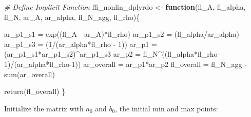 \documentclass[
]{book}
\newenvironment{Shaded}{\begin{snugshade}}{\end{snugshade}}
\newcommand{\CommentTok}[1]{\textcolor[rgb]{0.56,0.35,0.01}{\textit{#1}}}
\newcommand{\ControlFlowTok}[1]{\textcolor[rgb]{0.13,0.29,0.53}{\textbf{#1}}}
\newcommand{\DecValTok}[1]{\textcolor[rgb]{0.00,0.00,0.81}{#1}}
\newcommand{\FunctionTok}[1]{\textcolor[rgb]{0.00,0.00,0.00}{#1}}
\newcommand{\NormalTok}[1]{#1}
\newcommand{\OtherTok}[1]{\textcolor[rgb]{0.56,0.35,0.01}{#1}}
\newcommand{\SpecialCharTok}[1]{\textcolor[rgb]{0.00,0.00,0.00}{#1}}
\begin{document}
\begin{Shaded}
\begin{Highlighting}[]
\CommentTok{\# Define Implicit Function}
\NormalTok{ffi\_nonlin\_dplyrdo }\OtherTok{\textless{}{-}} \ControlFlowTok{function}\NormalTok{(fl\_A, fl\_alpha, fl\_N, ar\_A, ar\_alpha, fl\_N\_agg, fl\_rho)\{}

\NormalTok{  ar\_p1\_s1 }\OtherTok{=} \FunctionTok{exp}\NormalTok{((fl\_A }\SpecialCharTok{{-}}\NormalTok{ ar\_A)}\SpecialCharTok{*}\NormalTok{fl\_rho)}
\NormalTok{  ar\_p1\_s2 }\OtherTok{=}\NormalTok{ (fl\_alpha}\SpecialCharTok{/}\NormalTok{ar\_alpha)}
\NormalTok{  ar\_p1\_s3 }\OtherTok{=}\NormalTok{ (}\DecValTok{1}\SpecialCharTok{/}\NormalTok{(ar\_alpha}\SpecialCharTok{*}\NormalTok{fl\_rho }\SpecialCharTok{{-}} \DecValTok{1}\NormalTok{))}
\NormalTok{  ar\_p1 }\OtherTok{=}\NormalTok{ (ar\_p1\_s1}\SpecialCharTok{*}\NormalTok{ar\_p1\_s2)}\SpecialCharTok{\^{}}\NormalTok{ar\_p1\_s3}
\NormalTok{  ar\_p2 }\OtherTok{=}\NormalTok{ fl\_N}\SpecialCharTok{\^{}}\NormalTok{((fl\_alpha}\SpecialCharTok{*}\NormalTok{fl\_rho}\DecValTok{{-}1}\NormalTok{)}\SpecialCharTok{/}\NormalTok{(ar\_alpha}\SpecialCharTok{*}\NormalTok{fl\_rho}\DecValTok{{-}1}\NormalTok{))}
\NormalTok{  ar\_overall }\OtherTok{=}\NormalTok{ ar\_p1}\SpecialCharTok{*}\NormalTok{ar\_p2}
\NormalTok{  fl\_overall }\OtherTok{=}\NormalTok{ fl\_N\_agg }\SpecialCharTok{{-}} \FunctionTok{sum}\NormalTok{(ar\_overall)}

  \FunctionTok{return}\NormalTok{(fl\_overall)}
\NormalTok{\}}
\end{Highlighting}
\end{Shaded}

Initialize the matrix with \(a_0\) and \(b_0\), the initial min and max points:
\end{document}
